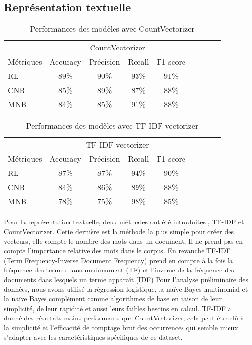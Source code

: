 \subsection{Représentation textuelle}
\begin{table}[h!]
    \centering
    \begin{tabular}{lcccccccc}
        \toprule
        & \multicolumn{4}{c}{CountVectorizer} \\
        \cmidrule(lr){2-5}
        Métriques & Accuracy & Précision & Recall & F1-score \\
        \midrule
        RL & 89\% & 90\% & 93\% & 91\% \\
        CNB & 85\% & 89\% & 87\% & 88\% \\
        MNB & 84\% & 85\% & 91\% & 88\% \\
        \bottomrule
    \end{tabular}
    \caption{Performances des modèles avec CountVectorizer}
    \label{tab:model_performance_countvectorizer}
\end{table}

\begin{table}[h!]
    \centering
    \begin{tabular}{lcccccccc}
        \toprule
        & \multicolumn{4}{c}{TF-IDF vectorizer} \\
        \cmidrule(lr){2-5}
        Métriques & Accuracy & Précision & Recall & F1-score \\
        \midrule
        RL & 87\% & 87\% & 94\% & 90\% \\
        CNB & 84\% & 86\% & 89\% & 88\% \\
        MNB & 78\% & 75\% & 98\% & 85\% \\
        \bottomrule
    \end{tabular}
    \caption{Performances des modèles avec TF-IDF vectorizer}
    \label{tab:model_performance_tfidfvectorizer}
\end{table}

Pour la représentation textuelle, deux méthodes ont été introduites ; TF-IDF et     CountVectorizer. Cette dernière est la méthode la plus simple pour créer des vecteurs, elle compte le nombre des mots dans un document, Il ne prend pas en compte l'importance relative des mots dans le corpus. En revanche TF-IDF (Term Frequency-Inverse Document Frequency) prend en compte à la fois la fréquence des termes dans un document (TF) et l'inverse de la fréquence des documents dans lesquels un terme apparaît (IDF)
Pour l’analyse préliminaire des données, nous avons utilisé la régression logistique, la naïve Bayes multinomial et la naïve Bayes complément comme algorithmes de base en raison de leur simplicité, de leur rapidité et aussi leurs faibles besoins en calcul.
TF-IDF a donné des résultats moins performants que CountVectorizer, cela peut être dû à   la simplicité et l’efficacité de comptage brut des occurrences qui semble mieux s’adapter avec les caractéristiques spécifiques de ce dataset.







